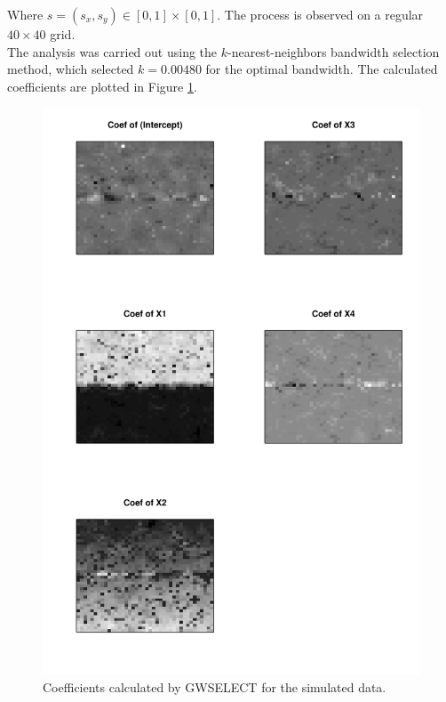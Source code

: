 \documentclass[authoryear ,review]{elsarticle}
\begin{document}
			Where $s=(s_x, s_y) \in [0,1] \times [0,1]$. The process is observed on a regular $40 \times 40$ grid.\\
			
			The analysis was carried out using the $k$-nearest-neighbors bandwidth selection method, which selected $k=0.00480$ for the optimal bandwidth. The calculated coefficients are plotted in Figure \ref{simulation-coefs}.\\
			
			
			\begin{figure}
				\begin{center}
					\includegraphics{../../figures/simulation/coefs}
					\caption{Coefficients calculated by GWSELECT for the simulated data.\label{simulation-coefs}}
				\end{center}
			\end{figure}
			
		


\end{document}
